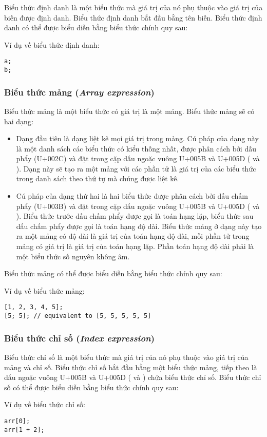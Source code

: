     Biểu thức định danh là một biểu thức mà giá trị của nó phụ thuộc vào giá trị của biến được định danh. Biểu thức định danh bắt đầu bằng tên biến. Biểu thức định danh có thể được biểu diễn bằng biểu thức chính quy sau:

\regexidentexpr

\noindent Ví dụ về biểu thức định danh:
\begin{lstlisting}[]
a;
b;
\end{lstlisting}

\subsubsection{Biểu thức mảng (\textit{Array expression})}
\label{ch2:arrayexpr}

    Biểu thức mảng là một biểu thức có giá trị là một mảng. Biểu thức mảng sẽ có hai dạng:

\begin{itemize}
    \item Dạng đầu tiên là dạng liệt kê mọi giá trị trong mảng. Cú pháp của dạng này là một danh sách các biểu thức có kiểu thống nhất, được phân cách bởi dấu phẩy \kw{,} (U+002C) và đặt trong cặp dấu ngoặc vuông U+005B và U+005D (\kw{[} và \kw{]}). Dạng này sẽ tạo ra một mảng với các phần tử là giá trị của các biểu thức trong danh sách theo thứ tự mà chúng được liệt kê.  
    \item Cú pháp của dạng thứ hai là hai biểu thức được phân cách bởi dấu chấm phẩy \kw{;} (U+003B) và đặt trong cặp dấu ngoặc vuông U+005B và U+005D (\kw{[} và \kw{]}). Biểu thức trước dấu chấm phẩy được gọi là toán hạng lặp, biểu thức sau dấu chấm phẩy được gọi là toán hạng độ dài. Biểu thức mảng ở dạng này tạo ra một mảng có độ dài là giá trị của toán hạng độ dài, mỗi phần tử trong mảng có giá trị là giá trị của toán hạng lặp. Phần toán hạng độ dài phải là một biểu thức số nguyên không âm.
\end{itemize}

    Biểu thức mảng có thể được biểu diễn bằng biểu thức chính quy sau:

\regexarrayexpr

\noindent Ví dụ về biểu thức mảng:
\begin{lstlisting}[]
[1, 2, 3, 4, 5];
[5; 5]; // equivalent to [5, 5, 5, 5, 5]
\end{lstlisting}

\subsubsection{Biểu thức chỉ số (\textit{Index expression})}

    Biểu thức chỉ số là một biểu thức mà giá trị của nó phụ thuộc vào giá trị của mảng và chỉ số. Biểu thức chỉ số bắt đầu bằng một biểu thức mảng, tiếp theo là dấu ngoặc vuông U+005B và U+005D (\kw{[} và \kw{]}) chứa biểu thức chỉ số. Biểu thức chỉ số có thể được biểu diễn bằng biểu thức chính quy sau:

\regexindexexpr

\noindent Ví dụ về biểu thức chỉ số:
\begin{lstlisting}[]
arr[0];
arr[1 + 2];
\end{lstlisting}
